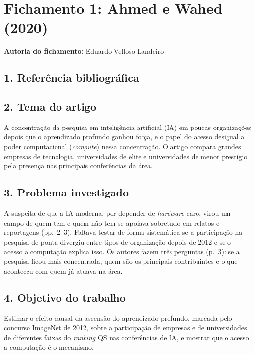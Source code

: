 \section{Fichamento 1: Ahmed e Wahed (2020)}

\noindent\textbf{Autoria do fichamento:} Eduardo Velloso Landeiro

\subsection*{1. Referência bibliográfica}
\noindent{}

\subsection*{2. Tema do artigo}
A concentração da pesquisa em inteligência artificial (IA) em poucas organizações depois que o
aprendizado profundo ganhou força, e o papel do acesso desigual a poder computacional
(\emph{compute}) nessa concentração. O artigo compara grandes empresas de tecnologia,
universidades de elite e universidades de menor prestígio pela presença nas principais
conferências da área.

\subsection*{3. Problema investigado}
A suspeita de que a IA moderna, por depender de \emph{hardware} caro, virou um campo de quem tem e
quem não tem se apoiava sobretudo em relatos e reportagens (pp.~2--3). Faltava testar de forma
sistemática se a participação na pesquisa de ponta divergiu entre tipos de organização depois de
2012 e se o acesso a computação explica isso. Os autores fazem três perguntas (p.~3): se a pesquisa
ficou mais concentrada, quem são os principais contribuintes e o que aconteceu com quem já atuava
na área.

\subsection*{4. Objetivo do trabalho}
Estimar o efeito causal da ascensão do aprendizado profundo, marcada pelo concurso ImageNet de
2012, sobre a participação de empresas e de universidades de diferentes faixas do \emph{ranking} QS
nas conferências de IA, e mostrar que o acesso a computação é o mecanismo.

